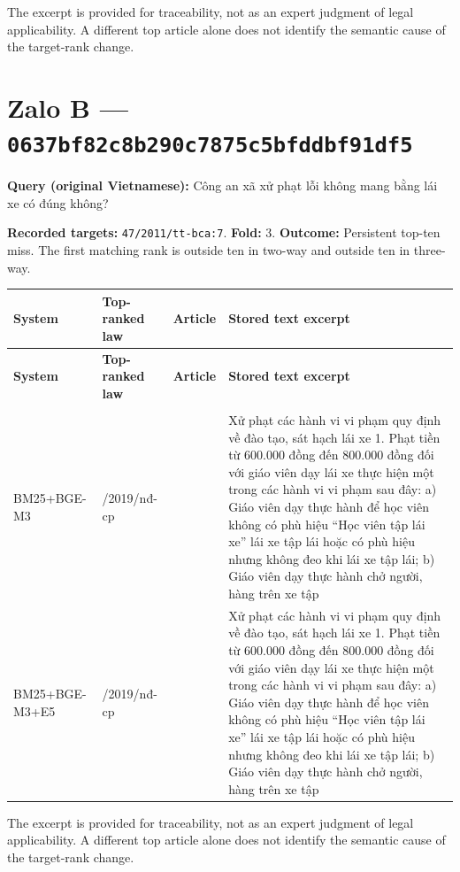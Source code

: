 The excerpt is provided for traceability, not as an expert judgment of legal applicability. A different top article alone does not identify the semantic cause of the target-rank change.

\section{Zalo B — \texttt{0637bf82\allowbreak{}c8b290c7\allowbreak{}875c5bfd\allowbreak{}dbf91df5}}

\textbf{Query (original Vietnamese):} Công an xã xử phạt lỗi không mang bằng lái xe có đúng không?

\textbf{Recorded targets:} \texttt{47/2011/\allowbreak{}tt-bca:7}. \textbf{Fold:} 3. \textbf{Outcome:} Persistent top-ten miss. The first matching rank is outside ten in two-way and outside ten in three-way.

\begingroup
\scriptsize
\setlength{\tabcolsep}{2pt}
\renewcommand{\arraystretch}{1.0}
\begin{longtable}{>{\raggedright\arraybackslash}p{2.022cm}>{\raggedright\arraybackslash}p{2.022cm}>{\raggedright\arraybackslash}p{1.891cm}>{\raggedright\arraybackslash}p{9.185cm}}
\toprule
\textbf{System} & \textbf{Top-ranked law} & \textbf{Article} & \textbf{Stored text excerpt} \\
\midrule
\endfirsthead
\toprule
\textbf{System} & \textbf{Top-ranked law} & \textbf{Article} & \textbf{Stored text excerpt} \\
\midrule
\endhead
\midrule
\multicolumn{4}{r}{\footnotesize Continued on next page}\\
\endfoot
\bottomrule
\endlastfoot
BM25+\allowbreak{}BGE-M3 & 100/\allowbreak{}2019/\allowbreak{}nđ-cp & 37 & Xử phạt các hành vi vi phạm quy định về đào tạo, sát hạch lái xe    1. Phạt tiền từ 600.000 đồng đến 800.000 đồng đối với giáo viên dạy lái xe thực hiện một trong các hành vi vi phạm sau đây:    a) Giáo viên dạy thực hành để học viên không có phù hiệu “Học viên tập lái xe” lái xe tập lái hoặc có phù hiệu nhưng không đeo khi lái xe tập lái;    b) Giáo viên dạy thực hành chở người, hàng trên xe tập \\
BM25+\allowbreak{}BGE-M3+\allowbreak{}E5 & 100/\allowbreak{}2019/\allowbreak{}nđ-cp & 37 & Xử phạt các hành vi vi phạm quy định về đào tạo, sát hạch lái xe    1. Phạt tiền từ 600.000 đồng đến 800.000 đồng đối với giáo viên dạy lái xe thực hiện một trong các hành vi vi phạm sau đây:    a) Giáo viên dạy thực hành để học viên không có phù hiệu “Học viên tập lái xe” lái xe tập lái hoặc có phù hiệu nhưng không đeo khi lái xe tập lái;    b) Giáo viên dạy thực hành chở người, hàng trên xe tập \\
\end{longtable}
\endgroup

The excerpt is provided for traceability, not as an expert judgment of legal applicability. A different top article alone does not identify the semantic cause of the target-rank change.
